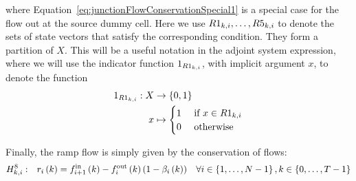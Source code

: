 where Equation~\eqref{eq:junctionFlowConservationSpecial1} is a special case for the flow out at the source dummy cell.
Here we use $R{1}_{k, i}, \dots, R{5}_{k, i}$ to denote the sets of state vectors that satisfy the corresponding condition. They form a partition of $X$. This will be a useful notation in the adjoint system expression, where we will use the indicator function $1_{R{1}_{k, i}}$, with implicit argument $x$, to denote the function
\[
\begin{aligned}
1_{R{1}_{k, i}} : X &\rightarrow \{0, 1\} \\
x & \mapsto \begin{cases} 1 & \text{ if } x \in R{1}_{k, i} \\ 0 & \text{ otherwise }\end{cases}
\end{aligned}
\]

Finally, the ramp flow is simply given by the conservation of flows:
\begin{align}
H^{8}_{k, i}: && r_{i}\left(k\right) & = f_{i+1}^{\text{in}}\left(k\right) - f_{i}^{\text{out}}\left(k\right)\left(1-\beta_{i}\left(k\right)\right)& \forall i\in\left\{ 1,\ldots,N-1\right\} ,k\in\left\{ 0,\ldots,T-1\right\}
\label{eq:junctionFlowConservation}
\end{align}

\setcounter{equation}{6}


